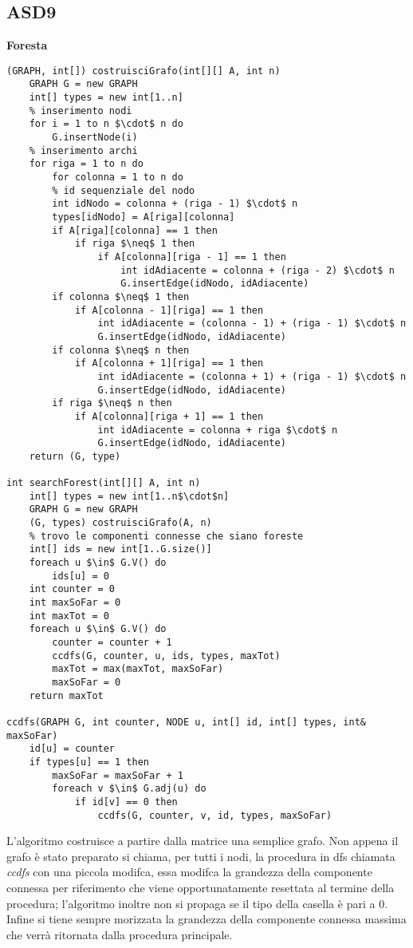 \documentclass[../cheatSheetAlgoritmi.tex]{subfiles}
\begin{document}
\subsection{ASD9}
\textbf{Foresta}
\begin{lstlisting}[caption=Foresta con costruzione del grafo]
(GRAPH, int[]) costruisciGrafo(int[][] A, int n)
	GRAPH G = new GRAPH
  	int[] types = new int[1..n]
  	% inserimento nodi
  	for i = 1 to n $\cdot$ n do
    	G.insertNode(i)
  	% inserimento archi
  	for riga = 1 to n do
    	for colonna = 1 to n do
      	% id sequenziale del nodo
      	int idNodo = colonna + (riga - 1) $\cdot$ n
      	types[idNodo] = A[riga][colonna]
      	if A[riga][colonna] == 1 then
        	if riga $\neq$ 1 then 
          		if A[colonna][riga - 1] == 1 then 
            		int idAdiacente = colonna + (riga - 2) $\cdot$ n
            		G.insertEdge(idNodo, idAdiacente)
        if colonna $\neq$ 1 then
          	if A[colonna - 1][riga] == 1 then 
            	int idAdiacente = (colonna - 1) + (riga - 1) $\cdot$ n
            	G.insertEdge(idNodo, idAdiacente)
        if colonna $\neq$ n then
          	if A[colonna + 1][riga] == 1 then 
            	int idAdiacente = (colonna + 1) + (riga - 1) $\cdot$ n
            	G.insertEdge(idNodo, idAdiacente)
        if riga $\neq$ n then
          	if A[colonna][riga + 1] == 1 then 
            	int idAdiacente = colonna + riga $\cdot$ n
            	G.insertEdge(idNodo, idAdiacente)
  	return (G, type)

int searchForest(int[][] A, int n)
	int[] types = new int[1..n$\cdot$n]
  	GRAPH G = new GRAPH
  	(G, types) costruisciGrafo(A, n)
  	% trovo le componenti connesse che siano foreste
  	int[] ids = new int[1..G.size()]
  	foreach u $\in$ G.V() do
  		ids[u] = 0
  	int counter = 0
 	int maxSoFar = 0
  	int maxTot = 0
  	foreach u $\in$ G.V() do
    	counter = counter + 1
    	ccdfs(G, counter, u, ids, types, maxTot)
    	maxTot = max(maxTot, maxSoFar) 
    	maxSoFar = 0
  	return maxTot

ccdfs(GRAPH G, int counter, NODE u, int[] id, int[] types, int& maxSoFar)
	id[u] = counter
  	if types[u] == 1 then
  		maxSoFar = maxSoFar + 1
 		foreach v $\in$ G.adj(u) do
    		if id[v] == 0 then
      			ccdfs(G, counter, v, id, types, maxSoFar)
\end{lstlisting}
L'algoritmo costruisce a partire dalla matrice una semplice grafo. Non appena il grafo è stato preparato si chiama, per tutti i nodi, la procedura in dfs chiamata \textit{ccdfs} con una piccola modifca, essa modifca la grandezza della componente connessa per riferimento che viene opportunatamente resettata al termine della procedura; l'algoritmo inoltre non si propaga se il tipo della casella è pari a 0. Infine si tiene sempre morizzata la grandezza della componente connessa massima che verrà ritornata dalla procedura principale.\\\\
\end{document}
